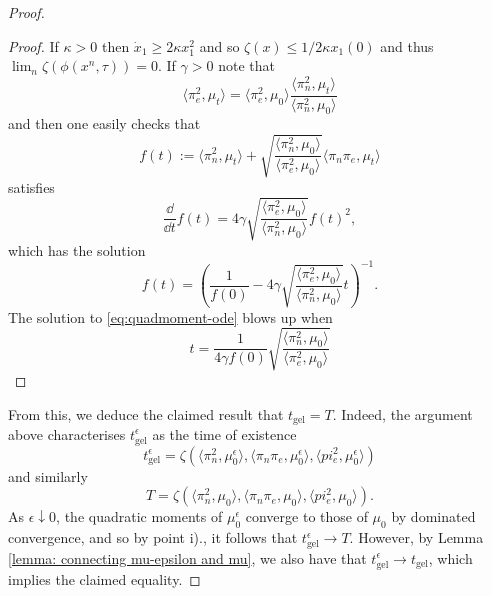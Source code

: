 \begin{proof}
\begin{proof}
If $\kappa > 0$ then $\dot x_1 \geq 2\kappa x_1^2$ and so $\zeta(x) \leq 1 / 2\kappa x_1(0)$ and thus $\lim_n \zeta\left(\phi(x^n,\tau)\right) = 0$.
If $\gamma > 0$
 note that
\begin{equation}\label{eq:proportional}
    \langle \pi_e^2, \mu_t\rangle = \langle \pi_e^2, \mu_0\rangle
    \frac{\langle \pi_n^2, \mu_t\rangle}{\langle \pi_n^2, \mu_0\rangle}
\end{equation}
and then one easily checks that
\begin{equation}
    f(t) := \langle \pi_n^2, \mu_t\rangle
           + \sqrt{\frac{\langle \pi_n^2, \mu_0\rangle}
                        {\langle \pi_e^2, \mu_0\rangle}}
             \langle \pi_n \pi_e, \mu_t\rangle
\end{equation}
satisfies
\begin{equation*}
    \frac{\dd }{\dd t}f(t) = 4\gamma 
    \sqrt{\frac{\langle \pi_e^2, \mu_0\rangle}
                        {\langle \pi_n^2, \mu_0\rangle}}f(t)^2,
\end{equation*}
which has the solution
\begin{equation}\label{eq:quadmoment-ode}
    f(t) = \left(\frac{1}{f(0)} - 4\gamma 
    \sqrt{\frac{\langle \pi_e^2, \mu_0\rangle}
                        {\langle \pi_n^2, \mu_0\rangle}}t \right)^{-1}.
\end{equation}
The solution to \eqref{eq:quadmoment-ode} blows up when
\begin{equation}\label{eq:quad-tgel}
    t = \frac{1}{4\gamma f(0)}
             \sqrt{\frac{\langle \pi_n^2, \mu_0\rangle}
                        {\langle \pi_e^2, \mu_0\rangle}}
\end{equation}
\end{proof}

From this, we deduce the claimed result that $t_\mathrm{gel}=T$. Indeed, the argument above characterises $t_\mathrm{gel}^\epsilon$ as the time of existence \begin{equation}
    t_\mathrm{gel}^\epsilon=\zeta(\langle \pi_n^2, \mu^\epsilon_0\rangle, \langle \pi_n \pi_e, \mu^\epsilon_0\rangle, \langle pi_e^2, \mu_0^\epsilon\rangle)
\end{equation} and similarly \begin{equation}  T=\zeta(\langle \pi_n^2, \mu_0\rangle, \langle \pi_n \pi_e, \mu_0\rangle, \langle pi_e^2, \mu_0\rangle). \end{equation} As $\epsilon \downarrow 0$, the quadratic moments of $\mu^\epsilon_0$ converge to those of $\mu_0$ by dominated convergence, and so by point i)., it follows that $t^\epsilon_\mathrm{gel}\rightarrow T$. However, by Lemma \ref{lemma: connecting mu-epsilon and mu}, we also have that $t_\mathrm{gel}^\epsilon\rightarrow t_\mathrm{gel}$, which implies the claimed equality.


\end{proof}
